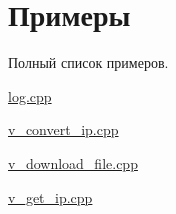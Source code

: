 \section{Примеры}
Полный список примеров.\begin{DoxyCompactItemize}
\item 
\hyperlink{log_8cpp-example}{log.\+cpp}
\item 
\hyperlink{v_convert_ip_8cpp-example}{v\+\_\+convert\+\_\+ip.\+cpp}
\item 
\hyperlink{v_download_file_8cpp-example}{v\+\_\+download\+\_\+file.\+cpp}
\item 
\hyperlink{v_get_ip_8cpp-example}{v\+\_\+get\+\_\+ip.\+cpp}
\end{DoxyCompactItemize}
